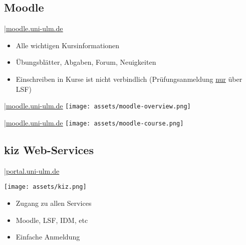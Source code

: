 \documentclass[
	aspectratio=169, 
	10pt 
]{beamer}
\begin{document}
\subsection{Moodle}
\begin{frame}{\insertsubsection \space|\space\underline{\href{https://moodle.uni-ulm.de}{moodle.uni-ulm.de}}}
    \begin{itemize}
        \item Alle wichtigen Kursinformationen 
        \item Übungsblätter, Abgaben, Forum, Neuigkeiten
        \item Einschreiben in Kurse ist nicht verbindlich (Prüfungsanmeldung \underline{nur} über LSF)
    \end{itemize}
\end{frame}

\begin{frame}{\insertsubsection \space|\space\underline{\href{https://moodle.uni-ulm.de}{moodle.uni-ulm.de}}}
    \texttt{[image: assets/moodle-overview.png]}
\end{frame}

\begin{frame}{\insertsubsection \space|\space\underline{\href{https://moodle.uni-ulm.de}{moodle.uni-ulm.de}}}
    \texttt{[image: assets/moodle-course.png]}
\end{frame}


\subsection{kiz Web-Services}
\begin{frame}{\insertsubsection \space|\space\underline{\href{https://portal.uni-ulm.de}{portal.uni-ulm.de}}}
    \begin{fancycolumns}[widths={60}]
        \texttt{[image: assets/kiz.png]}
        \nextcolumn
        \begin{itemize}
            \item Zugang zu allen Services
            \item Moodle, LSF, IDM, etc
            \item Einfache Anmeldung 
        \end{itemize}
    \end{fancycolumns}
\end{frame}
\end{document}
